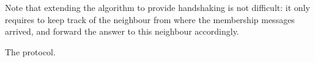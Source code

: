 Note that extending the algorithm to provide handshaking is not difficult: it
only requires to keep track of the neighbour from where the membership messages
arrived, and forward the answer to this neighbour accordingly.

\begin{algorithm}
  
  \caption{\label{algo:scamplon}The \SCAMPLON{} protocol.}
\end{algorithm}

